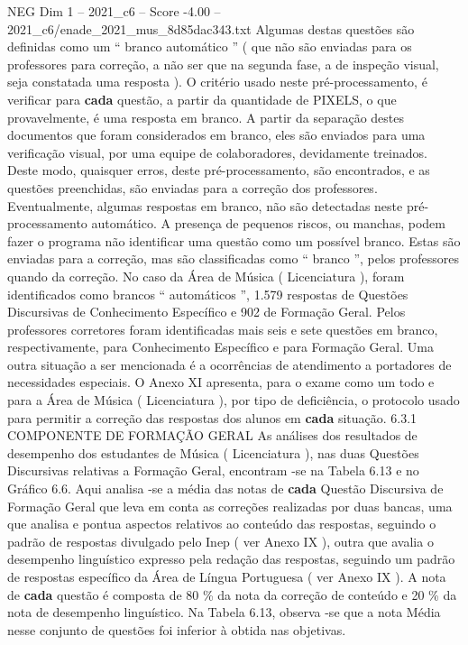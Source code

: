 \begin{textsample}{NEG Dim 1 – 2021\_c6 – Score -4.00 – 2021\_c6/enade\_2021\_mus\_8d85dac343.txt}
Algumas destas questões são definidas como um “ branco automático ” ( que não são enviadas para os professores para correção, a não ser que na segunda fase, a de inspeção visual, seja constatada uma resposta ).
O critério usado neste pré-processamento, é verificar para \textbf{cada} questão, a partir da quantidade de PIXELS, o que provavelmente, é uma resposta em branco.
A partir da separação destes documentos que foram considerados em branco, eles são enviados para uma verificação visual, por uma equipe de colaboradores, devidamente treinados.
Deste modo, quaisquer erros, deste pré-processamento, são encontrados, e as questões preenchidas, são enviadas para a correção dos professores.
Eventualmente, algumas respostas em branco, não são detectadas neste pré-processamento automático.
A presença de pequenos riscos, ou manchas, podem fazer o programa não identificar uma questão como um possível branco.
Estas são enviadas para a correção, mas são classificadas como “ branco ”, pelos professores quando da correção.
No caso da Área de Música ( Licenciatura ), foram identificados como brancos “ automáticos ”, 1.579 respostas de Questões Discursivas de Conhecimento Específico e 902 de Formação Geral.
Pelos professores corretores foram identificadas mais seis e sete questões em branco, respectivamente, para Conhecimento Específico e para Formação Geral.
Uma outra situação a ser mencionada é a ocorrências de atendimento a portadores de necessidades especiais.
O Anexo XI apresenta, para o exame como um todo e para a Área de Música ( Licenciatura ), por tipo de deficiência, o protocolo usado para permitir a correção das respostas dos alunos em \textbf{cada} situação. 6.3.1 COMPONENTE DE FORMAÇÃO GERAL As análises dos resultados de desempenho dos estudantes de Música ( Licenciatura ), nas duas Questões Discursivas relativas a Formação Geral, encontram -se na Tabela 6.13 e no Gráfico 6.6.
Aqui analisa -se a média das notas de \textbf{cada} Questão Discursiva de Formação Geral que leva em conta as correções realizadas por duas bancas, uma que analisa e pontua aspectos relativos ao conteúdo das respostas, seguindo o padrão de respostas divulgado pelo Inep ( ver Anexo IX ), outra que avalia o desempenho linguístico expresso pela redação das respostas, seguindo um padrão de respostas específico da Área de Língua Portuguesa ( ver Anexo IX ).
A nota de \textbf{cada} questão é composta de 80 \% da nota da correção de conteúdo e 20 \% da nota de desempenho linguístico.
Na Tabela 6.13, observa -se que a nota Média nesse conjunto de questões foi inferior à obtida nas objetivas.

\end{textsample}
